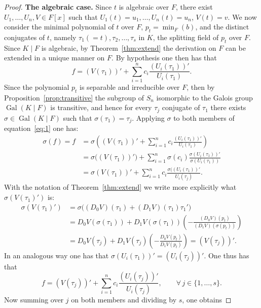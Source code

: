 \documentclass[11pt]{article}
\theoremstyle{plain}
\theoremstyle{definition}
\theoremstyle{remark}
\newcommand{\Gal}{\operatorname{Gal}}
\begin{document}
\begin{proof}
\medskip
\noindent\textbf{The algebraic case.}
Since $t$ is algebraic over $F$, there exist
$U_{1}, \ldots, U_{n}, V \in F[x]$ such that $U_{1}(t) = u_{1}, \ldots,
U_{n}(t) = u_{n}$, $V(t) = v$. We now consider the minimal polynomial
of $t$ over $F$, $p_{t} = \min_{F}(b)$, and the distinct conjugates of
$t$, namely $\tau_{1}(= t), \tau_{2}, \ldots, \tau_{s}$ in $K$, the
splitting field of $p_{t}$ over $F$. Since $K\mid F$ is algebraic, by
Theorem~\ref{thm:extend} the derivation on $F$ can be extended in a
unique manner on $F$. By hypothesis one then has that
\begin{equation}\label{eq:1}
f = (V(\tau_{1}))' + \sum_{i=1}^{n} c_{i}
\frac{(U_{i}(\tau_{1}))'}{U_{i}(\tau_{1})}.
\end{equation}
Since the polynomial $p_{t}$ is separable and irreducible over $F$,
then by Proposition~\ref{prop:transitive} the subgroup of $S_{n}$
isomorphic to the Galois group $\Gal(K\mid F)$ is transitive, and hence
for every $\tau_{j}$ conjugate of $\tau_{1}$ there exists
$\sigma \in \Gal(K\mid F)$ such that $\sigma(\tau_{1}) = \tau_{j}$.
Applying $\sigma$ to both members of equation~\eqref{eq:1} one has:
\begin{align*}
\sigma(f) = f
&= \sigma\!\left( (V(\tau_{1}))' + \sum_{i=1}^{n} c_{i}
\frac{(U_{i}(\tau_{1}))'}{U_{i}(\tau_{1})} \right)\\
&= \sigma\bigl((V(\tau_{1}))'\bigr) + \sum_{i=1}^{n} \sigma(c_{i})
\frac{\sigma(U_{i}(\tau_{1}))'}{\sigma(U_{i}(\tau_{1}))}\\
&= \sigma(V(\tau_{1}))' + \sum_{i=1}^{n} c_{i}
\frac{\sigma((U_{i}(\tau_{1}))'}{U_{i}(\tau_{j})}.
\end{align*}
With the notation of Theorem~\ref{thm:extend} we write more explicitly
what $\sigma(V(\tau_{1})')$ is:
\begin{align*}
\sigma(V(\tau_{1})')
&= \sigma\bigl((D_{0} V)(\tau_{1}) + (D_{1} V)(\tau_{1}) \tau_{1}'\bigr)\\
&= D_{0} V(\sigma(\tau_{1})) + D_{1} V(\sigma(\tau_{1}))
\left( -\frac{(D_{0} V)(p_{t})}{(D_{1} V)(\sigma(p_{t}))} \right)\\
&= D_{0} V(\tau_{j}) + D_{1} V(\tau_{j})
\left( -\frac{D_{0} V(p_{t})}{D_{1} V(p_{t})} \right)
= (V(\tau_{j}))'.
\end{align*}
In an analogous way one has that
$\sigma(U_{i}(\tau_{1}))' = (U_{i}(\tau_{j}))'$. One thus has that
\[
f = (V(\tau_{j}))' + \sum_{i=1}^{n} c_{i}
\frac{(U_{i}(\tau_{j}))'}{U_{i}(\tau_{j})},
\qquad \forall\, j \in \{1, \ldots, s\}.
\]
Now summing over $j$ on both members and dividing by $s$, one obtains

\end{proof}
\end{document}

